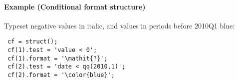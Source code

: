  \paragraph{Example (Conditional format structure)}
 
 Typeset negative values in italic, and values in periods before 2010Q1
 blue:
 
 \begin{verbatim}
 cf = struct();
 cf(1).test = 'value < 0';
 cf(1).format = '\mathit{?}';
 cf(2).test = 'date < qq(2010,1)';
 cf(2).format = '\color{blue}';
 \end{verbatim}


